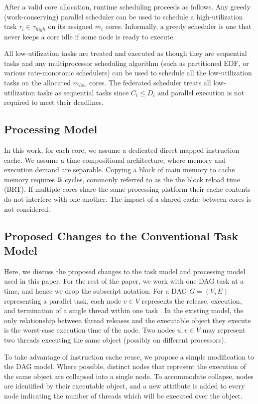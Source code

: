 After a valid core allocation, runtime scheduling proceeds as
follows. Any greedy (work-conserving) parallel scheduler can be used
to schedule a high-utilization task $\tau_{i} \in \tau_{high}$ on its
assigned $m_{i}$ cores. Informally, a greedy scheduler is one that never
keeps a core idle if some node is ready to execute. 

All low-utilization tasks are treated and executed as though they are
sequential tasks and any multiprocessor scheduling algorithm (such as
partitioned EDF, or various rate-monotonic schedulers) can be used to
schedule all the low-utilization tasks on the allocated $m_{low}$
cores. The federated scheduler treats all low-utilization tasks as sequential tasks
since $C_{i} \le D_{i}$ and parallel execution is not required to meet their
deadlines. 

\subsection{Processing Model}

In this work, for each core, we assume a dedicated direct mapped
instruction cache. We assume a time-compositional architecture\addcite,
where memory and execution demand are separable. Copying a block of 
main memory to cache memory requires $\mathbb{B}$ cycles, commonly
referred to as the the block reload time (BRT). If multiple cores share
the same processing platform their cache contents do not interfere with
one another. The impact of a shared cache between cores is not considered.


\subsection{Proposed Changes to the Conventional Task Model}
Here, we discuss the proposed changes to the task model and processing model used in this paper.
For the rest of the paper, we work with one DAG task at a time, and hence we drop the subscript notation.
For a DAG ${G = (V, E)}$ representing a parallel task, each node ${v \in V}$ represents
the release, execution, and termination of a single thread within one task 
\cite{li2014analysis}. In the existing model, the only relationship between thread releases and the executable object they execute is the worst-case execution time of the node. Two nodes ${u, v \in V}$ may represent two threads executing the same object (possibly on different processors).

To take advantage of instruction cache reuse, we propose a simple modification to the DAG
model. Where possible, distinct nodes that represent the execution of
the same object are collapsed into a single node. To accommodate collapse,
nodes are identified by their executable object, and a new attribute is added to every node
indicating the number of threads which will be executed over the object.

